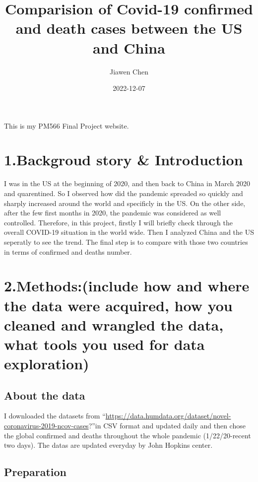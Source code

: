 \documentclass[
]{article}
\title{Comparision of Covid-19 confirmed and death cases between the US
and China}
\author{Jiawen Chen}
\date{2022-12-07}
\begin{document}
\maketitle

This is my PM566 Final Project website.

\hypertarget{backgroud-story-introduction}{%
\section{1.Backgroud story \&
Introduction}\label{backgroud-story-introduction}}

I was in the US at the beginning of 2020, and then back to China in
March 2020 and quarentined. So I observed how did the pandemic spreaded
so quickly and sharply increased around the world and specificly in the
US. On the other side, after the few first months in 2020, the pandemic
was considered as well controlled. Therefore, in this project, firstly I
will briefly check through the overall COVID-19 situation in the world
wide. Then I analyzed China and the US seperatly to see the trend. The
final step is to compare with those two countries in terms of confirmed
and deaths number.

\hypertarget{methodsinclude-how-and-where-the-data-were-acquired-how-you-cleaned-and-wrangled-the-data-what-tools-you-used-for-data-exploration}{%
\section{2.Methods:(include how and where the data were acquired, how
you cleaned and wrangled the data, what tools you used for data
exploration)}\label{methodsinclude-how-and-where-the-data-were-acquired-how-you-cleaned-and-wrangled-the-data-what-tools-you-used-for-data-exploration}}

\hypertarget{about-the-data}{%
\subsection{About the data}\label{about-the-data}}

I downloaded the datasets from
``\url{https://data.humdata.org/dataset/novel-coronavirus-2019-ncov-cases}?''in
CSV format and updated daily and then chose the global confirmed and
deaths throughout the whole pandemic (1/22/20-recent two days). The
datas are updated everyday by John Hopkins center.

\hypertarget{preparation}{%
\subsection{Preparation}\label{preparation}}
\end{document}
